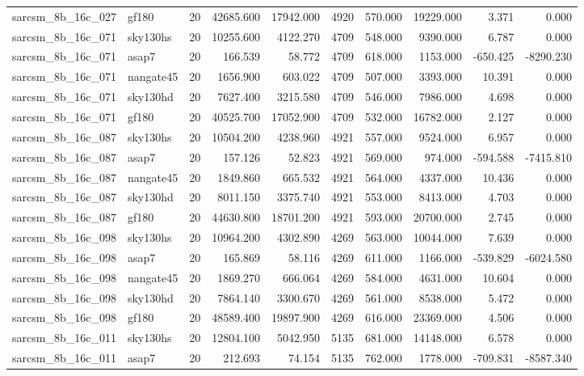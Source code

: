 \begin{longtable}{llrrrrrrrr}
sarcsm\_8b\_16c\_027 & gf180 & 20 & 42685.600 & 17942.000 & 4920 & 570.000 & 19229.000 & 3.371 & 0.000 \\
sarcsm\_8b\_16c\_071 & sky130hs & 20 & 10255.600 & 4122.270 & 4709 & 548.000 & 9390.000 & 6.787 & 0.000 \\
sarcsm\_8b\_16c\_071 & asap7 & 20 & 166.539 & 58.772 & 4709 & 618.000 & 1153.000 & -650.425 & -8290.230 \\
sarcsm\_8b\_16c\_071 & nangate45 & 20 & 1656.900 & 603.022 & 4709 & 507.000 & 3393.000 & 10.391 & 0.000 \\
sarcsm\_8b\_16c\_071 & sky130hd & 20 & 7627.400 & 3215.580 & 4709 & 546.000 & 7986.000 & 4.698 & 0.000 \\
sarcsm\_8b\_16c\_071 & gf180 & 20 & 40525.700 & 17052.900 & 4709 & 532.000 & 16782.000 & 2.127 & 0.000 \\
sarcsm\_8b\_16c\_087 & sky130hs & 20 & 10504.200 & 4238.960 & 4921 & 557.000 & 9524.000 & 6.957 & 0.000 \\
sarcsm\_8b\_16c\_087 & asap7 & 20 & 157.126 & 52.823 & 4921 & 569.000 & 974.000 & -594.588 & -7415.810 \\
sarcsm\_8b\_16c\_087 & nangate45 & 20 & 1849.860 & 665.532 & 4921 & 564.000 & 4337.000 & 10.436 & 0.000 \\
sarcsm\_8b\_16c\_087 & sky130hd & 20 & 8011.150 & 3375.740 & 4921 & 553.000 & 8413.000 & 4.703 & 0.000 \\
sarcsm\_8b\_16c\_087 & gf180 & 20 & 44630.800 & 18701.200 & 4921 & 593.000 & 20700.000 & 2.745 & 0.000 \\
sarcsm\_8b\_16c\_098 & sky130hs & 20 & 10964.200 & 4302.890 & 4269 & 563.000 & 10044.000 & 7.639 & 0.000 \\
sarcsm\_8b\_16c\_098 & asap7 & 20 & 165.869 & 58.116 & 4269 & 611.000 & 1166.000 & -539.829 & -6024.580 \\
sarcsm\_8b\_16c\_098 & nangate45 & 20 & 1869.270 & 666.064 & 4269 & 584.000 & 4631.000 & 10.604 & 0.000 \\
sarcsm\_8b\_16c\_098 & sky130hd & 20 & 7864.140 & 3300.670 & 4269 & 561.000 & 8538.000 & 5.472 & 0.000 \\
sarcsm\_8b\_16c\_098 & gf180 & 20 & 48589.400 & 19897.900 & 4269 & 616.000 & 23369.000 & 4.506 & 0.000 \\
sarcsm\_8b\_16c\_011 & sky130hs & 20 & 12804.100 & 5042.950 & 5135 & 681.000 & 14148.000 & 6.578 & 0.000 \\
sarcsm\_8b\_16c\_011 & asap7 & 20 & 212.693 & 74.154 & 5135 & 762.000 & 1778.000 & -709.831 & -8587.340 \\

\end{longtable}
